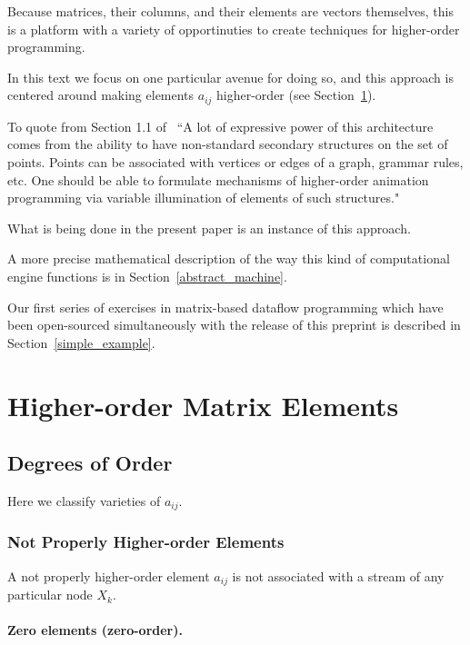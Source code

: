 \documentclass[withtimes]{easychair}
\begin{document}
Because matrices, their columns, and their elements are vectors themselves, this is a platform with a variety of opportinuties
to create techniques for higher-order programming.

In this text we focus on one particular avenue for doing so, and this approach is centered around making
elements $a_{ij}$ higher-order (see Section~\ref{higher_elements}).

To quote from Section 1.1 of~\cite{MBukatinMatthewsLinear}
``A lot of expressive power of this architecture comes from the ability to have non-standard secondary structures on the set of points.
Points can be associated with vertices or edges of a graph, grammar rules, etc. One should be able to formulate
mechanisms of higher-order animation programming via variable illumination of elements of such structures."

What is being done in the present paper is an instance of this approach.

A more precise mathematical description of the way this kind of computational engine functions
is in Section~\ref{abstract_machine}.

Our first series of exercises in matrix-based dataflow programming which have been open-sourced simultaneously with the release of this
preprint is described in Section~\ref{simple_example}.

\section{Higher-order Matrix Elements}\label{higher_elements}

\subsection{Degrees of Order}

Here we classify varieties of $a_{ij}$.

\subsubsection{Not Properly Higher-order Elements}

A not properly higher-order element $a_{ij}$ is not associated with a stream of any particular node $X_k$.

\paragraph{Zero elements (zero-order).}
\end{document}
